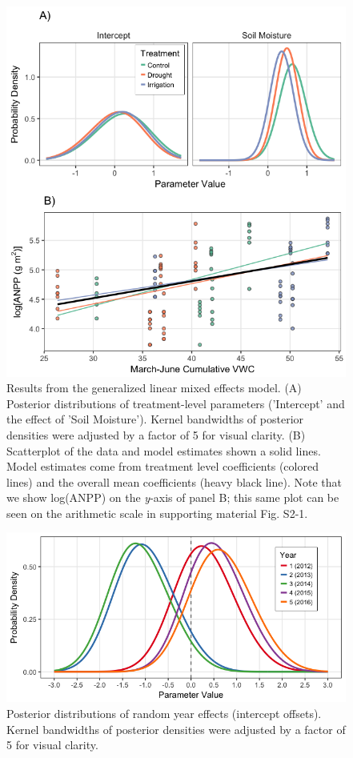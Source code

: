 \documentclass[fleqn,10pt,lineno]{wlpeerj} %
\begin{document}
\newpage{}

\begin{figure}[!ht]
  \centering
      \includegraphics[width=5in]{../figures/glmm_main_results.png}
  \caption{Results from the generalized linear mixed effects model. (A) Posterior distributions of treatment-level parameters ('Intercept' and the effect of 'Soil Moisture'). Kernel bandwidths of posterior densities were adjusted by a factor of 5 for visual clarity. (B) Scatterplot of the data and model estimates shown a solid lines. Model estimates come from treatment level coefficients (colored lines) and the overall mean coefficients (heavy black line). Note that we show log(ANPP) on the \emph{y}-axis of panel B; this same plot can be seen on the arithmetic scale in supporting material Fig. S2-1.}
\end{figure}

\newpage{}

\begin{figure}[!ht]
  \centering
      \includegraphics[width=5in]{../figures/glmm_yeardiffs.png}
  \caption{Posterior distributions of random year effects (intercept offsets). Kernel bandwidths of posterior densities were adjusted by a factor of 5 for visual clarity.}
\end{figure}
\end{document}
